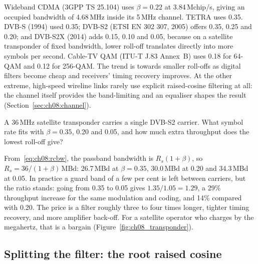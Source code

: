 \begin{inpractice}
Wideband CDMA (3GPP TS 25.104) uses $\beta=0.22$ at 3.84\,Mchip/s, giving an occupied
bandwidth of 4.68\,MHz inside its 5\,MHz channel. TETRA uses 0.35. DVB-S (1994) used 0.35;
DVB-S2 (ETSI EN 302 307, 2005) offers 0.35, 0.25 and 0.20; and DVB-S2X (2014) adds 0.15, 0.10
and 0.05, because on a satellite transponder of fixed bandwidth, lower roll-off translates
directly into more symbols per second. Cable-TV QAM (ITU-T J.83 Annex~B) uses 0.18 for 64-QAM
and 0.12 for 256-QAM. The trend is towards smaller roll-offs as digital filters become cheap
and receivers' timing recovery improves. At the other extreme, high-speed wireline links
rarely use explicit raised-cosine filtering at all: the channel itself provides the
band-limiting and an equaliser shapes the result (Section~\ref{sec:ch08:channel}).
\end{inpractice}

\begin{worked}
A 36\,MHz satellite transponder carries a single DVB-S2 carrier. What symbol rate fits with
$\beta=0.35$, 0.20 and 0.05, and how much extra throughput does the lowest roll-off give?

From~\eqref{eq:ch08:rcbw}, the passband bandwidth is $R_s(1+\beta)$, so $R_s=36/(1+\beta)$\,MBd:
26.7\,MBd at $\beta=0.35$, 30.0\,MBd at 0.20 and 34.3\,MBd at 0.05. In practice a guard
band of a few per cent is left between carriers, but the ratio stands: going from 0.35 to
0.05 gives $1.35/1.05=1.29$, a 29\% throughput increase for the same modulation and coding,
and 14\% compared with 0.20. The price is a filter roughly three to four times longer, tighter
timing recovery, and more amplifier back-off. For a satellite operator who charges by the
megahertz, that is a bargain (Figure~\ref{fig:ch08_transponder}).
\end{worked}


\subsection{Splitting the filter: the root raised cosine}

